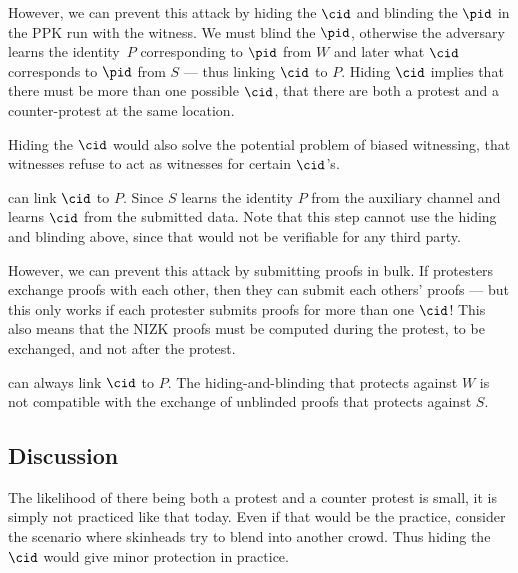 However, we can prevent this attack by hiding the \(\cid\) and blinding the 
\(\pid\) in the \ac{PPK} run with the witness.
We must blind the \(\pid\), otherwise the adversary learns the identity~\(P\) 
corresponding to \(\pid\) from \(W\) and later what \(\cid\) corresponds to 
\(\pid\) from \(S\) --- thus linking \(\cid\) to \(P\).
Hiding \(\cid\) implies that there must be more than one possible \(\cid\), \ie 
that there are both a protest and a counter-protest at the same location.

Hiding the \(\cid\) would also solve the potential problem of biased 
witnessing, \ie that witnesses refuse to act as witnesses for certain 
\(\cid\)'s.

 can link \(\cid\) to \(P\).
Since \(S\) learns the identity \(P\) from the auxiliary channel and learns 
\(\cid\) from the submitted data.
Note that this step cannot use the hiding and blinding above, since that would 
not be verifiable for any third party.

However, we can prevent this attack by submitting proofs in bulk.
If protesters exchange proofs with each other, then they can submit each 
others' proofs --- but this only works if each protester submits proofs for 
more than one \(\cid\)!
This also means that the \ac{NIZK} proofs must be computed during the protest, 
to be exchanged, and not after the protest.

 can always link \(\cid\) to \(P\).
The hiding-and-blinding that protects against \(W\) is not compatible with the 
exchange of unblinded proofs that protects against \(S\).

\subsection{Discussion}

The likelihood of there being both a protest and a counter protest is small, it 
is simply not practiced like that today.
Even if that would be the practice, consider the scenario where skinheads try 
to blend into another crowd.
Thus hiding the \(\cid\) would give minor protection in practice.

